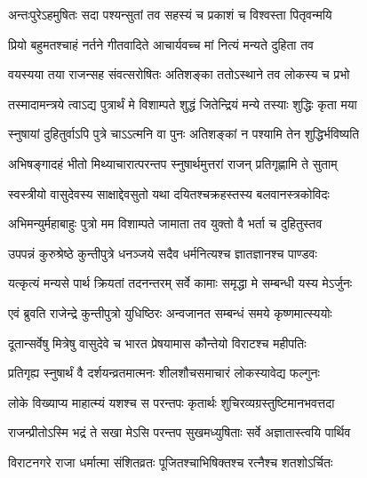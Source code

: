\twolineshloka
{अन्तःपुरेऽहमुषितः सदा पश्यन्सुतां तव}
{सहस्यं च प्रकाशं च विश्वस्ता पितृवन्मयि}


\twolineshloka
{प्रियो बहुमतश्चाहं नर्तने गीतवादिते}
{आचार्यवच्च मां नित्यं मन्यते दुहिता तव}


\twolineshloka
{वयस्यया तया राजन्सह संवत्सरोषितः}
{अतिशङ्का ततोऽस्थाने तव लोकस्य च प्रभो}


\twolineshloka
{तस्मादामन्त्रये त्वाऽद्य पुत्रार्थं मे विशाम्पते}
{शुद्धं जितेन्द्रियं मन्ये तस्याः शुद्धिः कृता मया}


\twolineshloka
{स्नुषायां दुहितुर्वाऽपि पुत्रे चाऽऽत्मनि वा पुनः}
{अतिशङ्कां न पश्यामि तेन शुद्धिर्भविष्यति}


\twolineshloka
{अभिषङ्गादहं भीतो मिथ्याचारात्परन्तप}
{स्नुषार्थमुत्तरां राजन् प्रतिगृह्णामि ते सुताम्}


\twolineshloka
{स्वस्त्रीयो वासुदेवस्य साक्षाद्देवसुतो यथा}
{दयितश्चक्रहस्तस्य बलवानस्त्रकोविदः}


\twolineshloka
{अभिमन्युर्महाबाहुः पुत्रो मम विशाम्पते}
{जामाता तव युक्तो वै भर्ता च दुहितुस्तव}




\twolineshloka
{उपपन्नं कुरुश्रेष्ठे कुन्तीपुत्रे धनञ्जये}
{सदैव धर्मनित्यश्च ज्ञातज्ञानश्च पाण्डवः}


\twolineshloka
{यत्कृत्यं मन्यसे पार्थ क्रियतां तदनन्तरम्}
{सर्वे कामाः समृद्धा मे सम्बन्धी यस्य मेऽर्जुनः}



\twolineshloka
{एवं ब्रुवति राजेन्द्रे कुन्तीपुत्रो युधिष्ठिरः}
{अन्वजानत सम्बन्धं समये कृष्णमात्स्ययोः}


\twolineshloka
{दूतान्सर्वेषु मित्रेषु वासुदेवे च भारत}
{प्रेषयामास कौन्तेयो विराटश्च महीपतिः}



\twolineshloka
{प्रतिगृह्य स्नुषार्थं वै दर्शयन्व्रतमात्मनः}
{शीलशौचसमाचारं लोकस्यावेद्य फल्गुनः}


\twolineshloka
{लोके विख्याप्य माहात्म्यं यशश्च स परन्तपः}
{कृतार्थः शुचिरव्यग्रस्तुष्टिमानभवत्तदा}




\twolineshloka
{राजन्प्रीतोऽस्मि भद्रं ते सखा मेऽसि परन्तप}
{सुखमध्युषिताः सर्वे अज्ञातास्त्वयि पार्थिव}



\twolineshloka
{विराटनगरे राजा धर्मात्मा संशितव्रतः}
{पूजितश्चाभिषिक्तश्च रत्नैश्च शतशोऽर्चितः}


